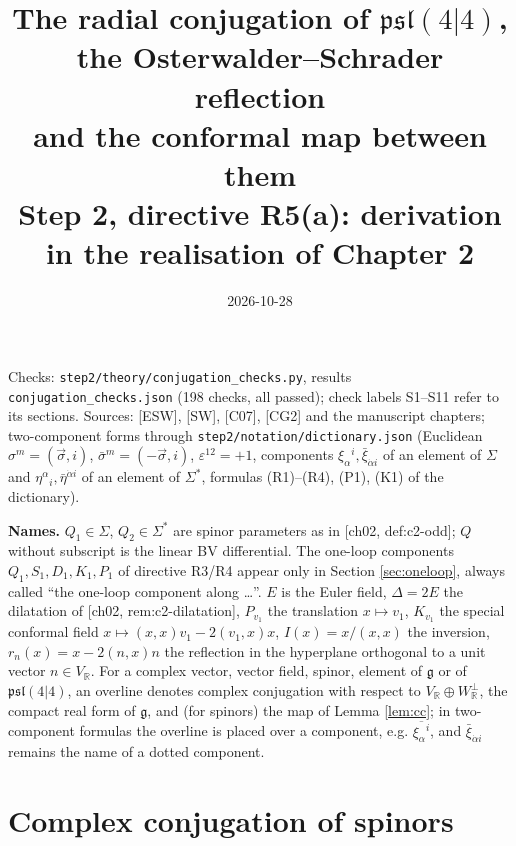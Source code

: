 \documentclass[11pt]{article}
\title{The radial conjugation of $\mathfrak{psl}(4|4)$, the Osterwalder--Schrader reflection\\ and the conformal map between them\\[3pt]
\large Step 2, directive R5(a): derivation in the realisation of Chapter 2}
\author{}
\date{2026-10-28}
\theoremstyle{definition}
\begin{document}
\maketitle

\noindent Checks: \texttt{step2/theory/conjugation\_checks.py}, results \texttt{conjugation\_checks.json} (198 checks, all passed); check labels S1--S11 refer to its sections. Sources: [ESW], [SW], [C07], [CG2] and the manuscript chapters; two-component forms through \texttt{step2/notation/dictionary.json} (Euclidean $\sigma^m=(\vec\sigma,i)$, $\bar\sigma^m=(-\vec\sigma,i)$, $\varepsilon^{12}=+1$, components $\xi_\alpha{}^i,\bar\xi_{\dot\alpha i}$ of an element of $\Sigma$ and $\eta^\alpha{}_i,\bar\eta^{\dot\alpha i}$ of an element of $\Sigma^*$, formulas (R1)--(R4), (P1), (K1) of the dictionary).

\textbf{Names.} $Q_1\in\Sigma$, $Q_2\in\Sigma^*$ are spinor parameters as in [ch02, def:c2-odd]; $Q$ without subscript is the linear BV differential. The one-loop components $Q_1,S_1,D_1,K_1,P_1$ of directive R3/R4 appear only in Section \ref{sec:oneloop}, always called ``the one-loop component along \dots''. $E$ is the Euler field, $\Delta=2E$ the dilatation of [ch02, rem:c2-dilatation], $P_{v_1}$ the translation $x\mapsto v_1$, $K_{v_1}$ the special conformal field $x\mapsto(x,x)v_1-2(v_1,x)x$, $I(x)=x/(x,x)$ the inversion, $r_n(x)=x-2(n,x)n$ the reflection in the hyperplane orthogonal to a unit vector $n\in V_{\mathbb R}$. For a complex vector, vector field, spinor, element of $\mathfrak g$ or of $\mathfrak{psl}(4|4)$, an overline denotes complex conjugation with respect to $V_{\mathbb R}\oplus W_{\mathbb R}^\perp$, the compact real form of $\mathfrak g$, and (for spinors) the map of Lemma \ref{lem:cc}; in two-component formulas the overline is placed over a component, e.g. $\overline{\xi_\alpha{}^i}$, and $\bar\xi_{\dot\alpha i}$ remains the name of a dotted component.

\section{Complex conjugation of spinors}
\end{document}
